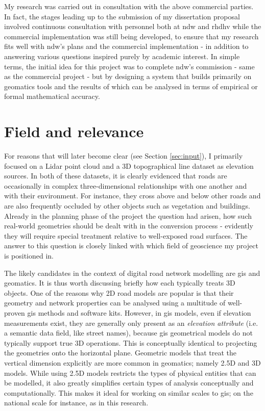 My research was carried out in consultation with the above commercial parties. In fact, the stages leading up to the submission of my dissertation proposal involved continuous consultation with personnel both at \ac{ndw} and \ac{rhdhv} while the commercial implementation was still being developed, to ensure that my research fits well with \ac{ndw}'s plans and the commercial implementation - in addition to answering various questions inspired purely by academic interest. In simple terms, the initial idea for this project was to complete \ac{ndw}'s commission - same as the commercial project - but by designing a system that builds primarily on geomatics tools and the results of which can be analysed in terms of empirical or formal mathematical accuracy.

\section{Field and relevance}
\label{sec:relevance}

For reasons that will later become clear (see Section \ref{sec:input}), I primarily focused on a Lidar point cloud and a 3D topographical line dataset as elevation sources. In both of these datasets, it is clearly evidenced that roads are occasionally in complex three-dimensional relationships with one another and with their environment. For instance, they cross above and below other roads and are also frequently occluded by other objects such as vegetation and buildings. Already in the planning phase of the project the question had arisen, how such real-world geometries should be dealt with in the conversion process - evidently they will require special treatment relative to well-exposed road surfaces. The answer to this question is closely linked with which field of geoscience my project is positioned in.

The likely candidates in the context of digital road network modelling are \ac{gis} and geomatics. It is thus worth discussing briefly how each typically treats 3D objects. One of the reasons why 2D road models are popular is that their geometry and network properties can be analysed using a multitude of well-proven \ac{gis} methods and software kits. However, in \ac{gis} models, even if elevation measurements exist, they are generally only present as an \textit{elevation attribute} (i.e. a semantic data field, like street names), because \ac{gis} geometrical models do not typically support true 3D operations. This is conceptually identical to projecting the geometries onto the horizontal plane. Geometric models that treat the vertical dimension explicitly are more common in geomatics; namely 2.5D and 3D models. While using 2.5D models restricts the types of physical entities that can be modelled, it also greatly simplifies certain types of analysis conceptually and computationally. This makes it ideal for working on similar scales to \ac{gis}; on the national scale for instance, as in this research.

